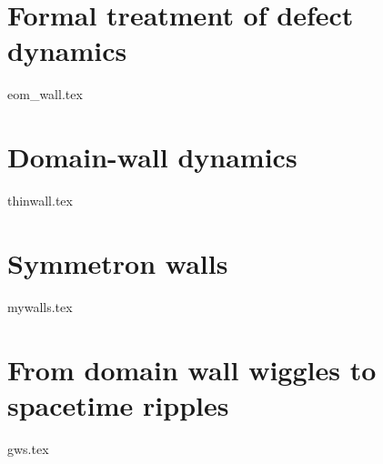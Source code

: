 \section{Formal treatment of defect dynamics}\label{sec:pertwalls:eom_wall}
    {{eom_wall.tex}}

\section{Domain-wall dynamics}\label{sec:pertwalls:thinwall}
    {{thinwall.tex}}

\section{Symmetron walls}\label{sec:pertwalls:mywalls}
    {{mywalls.tex}}

\section{From domain wall wiggles to spacetime ripples}\label{sec:pertwalls:gws}
    {{gws.tex}}





